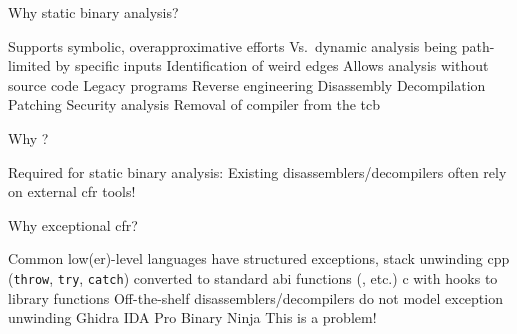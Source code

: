\begin{frame}{Why static binary analysis?}
  \begin{outline}
    \1 Supports symbolic, \alert{overapproximative} efforts
      \2 Vs.\ dynamic analysis being path-limited by specific inputs
      \2 Identification of \alert{weird} edges
    \1 Allows analysis without source code
      \2 Legacy programs
      \2 Reverse engineering
        \3 Disassembly
        \3 Decompilation
      \2 Patching
      \2 Security analysis
    \2 Removal of compiler from the \gls{tcb}
  \end{outline}

\end{frame}

\begin{frame}{Why ?}
  \begin{center}
    Required for static binary analysis: Existing disassemblers/decompilers often rely on external \gls{cfr} tools!
  \end{center}

\end{frame}

\begin{frame}{Why exceptional \gls{cfr}?}
  \begin{outline}
    \1 Common low(er)-level languages have structured exceptions, stack unwinding
      \2 \Gls{cpp} (\lstinline|throw|, \lstinline|try|, \lstinline|catch|) converted to standard \gls{abi} functions (, etc.)
      \2 \Gls{c} with hooks to library functions
    \1 Off-the-shelf \alert{disassemblers/decompilers} do not model exception unwinding
      \2 Ghidra
      \2 IDA Pro
      \2 Binary Ninja
    \1 This is a problem!
  \end{outline}
\end{frame}
